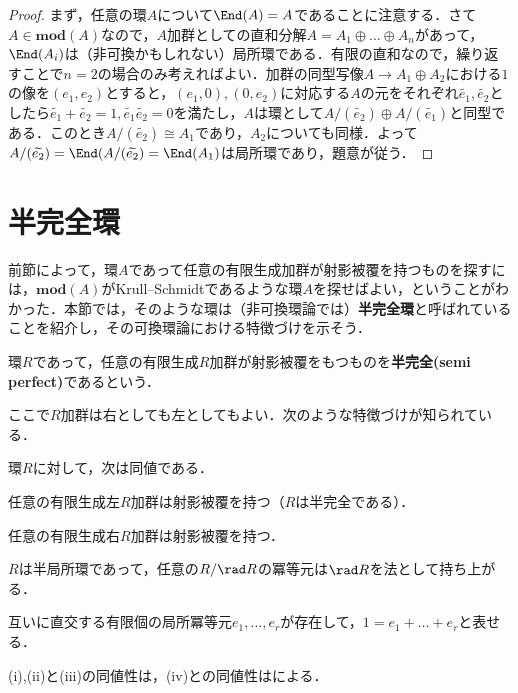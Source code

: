 \begin{proof}
	まず，任意の環$A$について$\End(A)=A$であることに注意する．さて$A\in\mathbf{mod}(A)$なので，$A$加群としての直和分解$A=A_1\oplus\dots\oplus A_n$があって，$\End(A_i)$は（非可換かもしれない）局所環である．有限の直和なので，繰り返すことで$n=2$の場合のみ考えればよい．加群の同型写像$A\to A_1\oplus A_2$における$1$の像を$(e_1,e_2)$とすると，$(e_1,0),(0,e_2)$に対応する$A$の元をそれぞれ$\widetilde{e_1},\widetilde{e_2}$としたら$\widetilde{e_1}+\widetilde{e_2}=1, \widetilde{e_1}\widetilde{e_2}=0$を満たし，$A$は環として$A/(\widetilde{e_2})\oplus A/(\widetilde{e_1})$と同型である．このとき$A/(\widetilde{e_2})\cong A_1$であり，$A_2$についても同様．よって$A/(\widetilde{e_2})=\End(A/(\widetilde{e_2})=\End(A_1)$は局所環であり，題意が従う．
\end{proof}


\section{半完全環}

前節によって，環$A$であって任意の有限生成加群が射影被覆を持つものを探すには，$\mathbf{mod}(A)$がKrull--Schmidtであるような環$A$を探せばよい，ということがわかった．本節では，そのような環は（非可換環論では）\textbf{半完全環}と呼ばれていることを紹介し，その可換環論における特徴づけを示そう．

\begin{defi}[半完全環]
	環$R$であって，任意の有限生成$R$加群が射影被覆をもつものを\textbf{半完全(semi perfect)}であるという．
\end{defi}

ここで$R$加群は右としても左としてもよい．次のような特徴づけが知られている．
\begin{thm}
	環$R$に対して，次は同値である．
	\begin{sakura}
		\item 任意の有限生成左$R$加群は射影被覆を持つ（$R$は半完全である）．
		\item 任意の有限生成右$R$加群は射影被覆を持つ．
		\item $R$は半局所環であって，任意の$R/\rad R$の冪等元は$\rad R$を法として持ち上がる．
		\item 互いに直交する有限個の局所冪等元$e_1,\dots,e_r$が存在して，$1=e_1+\dots+e_r$と表せる．
	\end{sakura}
\end{thm}

(i),(ii)と(iii)の同値性は\cite{Bass1960}，(iv)との同値性は\cite{Muller1970}による．


